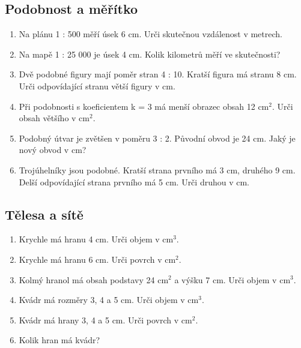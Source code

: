 \documentclass[11pt,a4paper]{article}
\begin{document}
\subsection*{Podobnost a měřítko}
\begin{enumerate}[label=\arabic*.,start=25,leftmargin=*,itemsep=6pt]
\item Na plánu 1 : 500 měří úsek 6 cm. Urči skutečnou vzdálenost v metrech.\par\vspace{2mm}
\item Na mapě 1 : 25 000 je úsek 4 cm. Kolik kilometrů měří ve skutečnosti?\par\vspace{2mm}
\item Dvě podobné figury mají poměr stran 4 : 10. Kratší figura má stranu 8 cm. Urči odpovídající stranu větší figury v cm.\par\vspace{2mm}
\item Při podobnosti s koeficientem k = 3 má menší obrazec obsah 12 cm$^2$. Urči obsah většího v cm$^2$.\par\vspace{2mm}
\item Podobný útvar je zvětšen v poměru 3 : 2. Původní obvod je 24 cm. Jaký je nový obvod v cm?\par\vspace{2mm}
\item Trojúhelníky jsou podobné. Kratší strana prvního má 3 cm, druhého 9 cm. Delší odpovídající strana prvního má 5 cm. Urči druhou v cm.\par\vspace{2mm}
\end{enumerate}

\subsection*{Tělesa a sítě}
\begin{enumerate}[label=\arabic*.,start=31,leftmargin=*,itemsep=6pt]
\item Krychle má hranu 4 cm. Urči objem v cm$^3$.\par\vspace{2mm}
\item Krychle má hranu 6 cm. Urči povrch v cm$^2$.\par\vspace{2mm}
\item Kolmý hranol má obsah podstavy 24 cm$^2$ a výšku 7 cm. Urči objem v cm$^3$.\par\vspace{2mm}
\item Kvádr má rozměry 3, 4 a 5 cm. Urči objem v cm$^3$.\par\vspace{2mm}
\item Kvádr má hrany 3, 4 a 5 cm. Urči povrch v cm$^2$.\par\vspace{2mm}
\item Kolik hran má kvádr?\par\vspace{2mm}
\end{enumerate}
\end{document}
